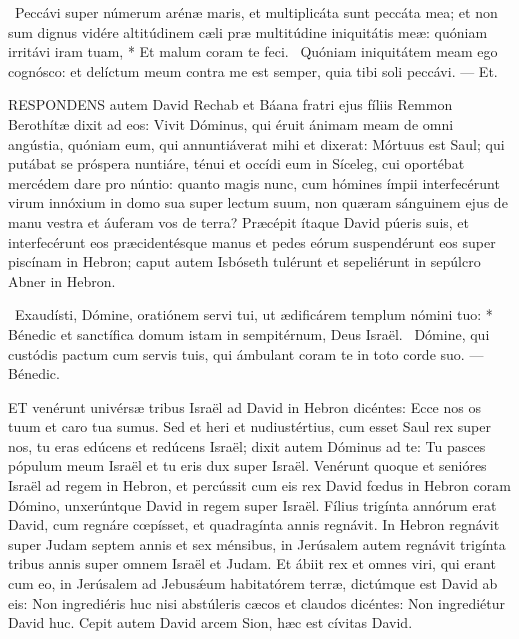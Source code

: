 \R\ Peccávi super númerum arénæ maris, et multiplicáta sunt peccáta mea; et non sum dignus vidére altitúdinem cæli præ multitúdine iniquitátis meæ: quóniam irritávi iram tuam, * Et malum coram te feci. \V\ Quóniam iniquitátem meam ego cognósco: et delíctum meum contra me est semper, quia tibi soli peccávi. --- Et.


\lettrine[lines=2]{R}{ESPONDENS} autem David Rechab et Báana fratri ejus fíliis Remmon Berothítæ dixit ad eos: Vivit Dóminus, qui éruit ánimam meam de omni angústia, quóniam eum, qui annuntiáverat mihi et dixerat: Mórtuus est Saul; qui putábat se próspera nuntiáre, ténui et occídi eum in Síceleg, cui oportébat mercédem dare pro núntio: quanto magis nunc, cum hómines ímpii interfecérunt virum innóxium in domo sua super lectum suum, non quæram sánguinem ejus de manu vestra et áuferam vos de terra? Præcépit ítaque David púeris suis, et interfecérunt eos præcidentésque manus et pedes eórum suspendérunt eos super piscínam in Hebron; caput autem Isbóseth tulérunt et sepeliérunt in sepúlcro Abner in Hebron.

\R\ Exaudísti, Dómine, oratiónem servi tui, ut ædificárem templum nómini tuo: * Bénedic et sanctífica domum istam in sempitérnum, Deus Israël. \V\ Dómine, qui custódis pactum cum servis tuis, qui ámbulant coram te in toto corde suo. --- Bénedic.



\lettrine[lines=2]{E}{T} venérunt univérsæ tribus Israël ad David in Hebron dicéntes: Ecce nos os tuum et caro tua sumus. Sed et heri et nudiustértius, cum esset Saul rex super nos, tu eras edúcens et redúcens Israël; dixit autem Dóminus ad te: Tu pasces pópulum meum Israël et tu eris dux super Israël. Venérunt quoque et senióres Israël ad regem in Hebron, et percússit cum eis rex David fœdus in Hebron coram Dómino, unxerúntque David in regem super Israël. Fílius trigínta annórum erat David, cum regnáre cœpísset, et quadragínta annis regnávit. In Hebron regnávit super Judam septem annis et sex ménsibus, in Jerúsalem autem regnávit trigínta tribus annis super omnem Israël et Judam. Et ábiit rex et omnes viri, qui erant cum eo, in Jerúsalem ad Jebusǽum habitatórem terræ, dictúmque est David ab eis: Non ingrediéris huc nisi abstúleris cæcos et claudos dicéntes: Non ingrediétur David huc. Cepit autem David arcem Sion, hæc est cívitas David.

